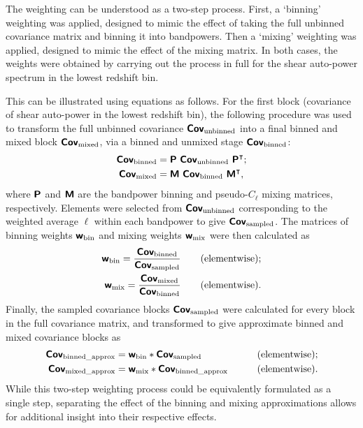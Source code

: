 The weighting can be understood as a two-step process.
First, a `binning' weighting was applied, designed to mimic the effect of taking the full unbinned covariance matrix and binning it into bandpowers. Then a `mixing' weighting was applied, designed to mimic the effect of the mixing matrix. In both cases, the weights were obtained by carrying out the process in full for the shear auto-power spectrum in the lowest redshift bin.

This can be illustrated using equations as follows. For the first block (covariance of shear auto-power in the lowest redshift bin), the following procedure was used to transform the full unbinned covariance $\bm{\mathsf{Cov}}_\text{unbinned}$ into a final binned and mixed block $\bm{\mathsf{Cov}}_\text{mixed}$, via a binned and unmixed stage $\bm{\mathsf{Cov}}_\text{binned}$:
\begin{align}
\bm{\mathsf{Cov}}_\text{binned} &=
\bm{\mathsf{P}} ~ \bm{\mathsf{Cov}}_\text{unbinned} ~
\bm{\mathsf{P}}^\intercal; \\
\bm{\mathsf{Cov}}_\text{mixed} &=
\bm{\mathsf{M}} ~ \bm{\mathsf{Cov}}_\text{binned} ~
\bm{\mathsf{M}}^\intercal,
\end{align}
where $\bm{\mathsf{P}}$ and $\bm{\mathsf{M}}$ are the bandpower binning and pseudo-$C_\ell$ mixing matrices, respectively. Elements were selected from $\bm{\mathsf{Cov}}_\text{unbinned}$ corresponding to the weighted average $\ell$ within each bandpower to give $\bm{\mathsf{Cov}}_\text{sampled}$. The matrices of binning weights $\bm{\mathsf{w}}_\text{bin}$ and mixing weights $\bm{\mathsf{w}}_\text{mix}$ were then calculated as
\begin{align}
\bm{\mathsf{w}}_\text{bin} =
\frac{\bm{\mathsf{Cov}}_\text{binned}}
{\bm{\mathsf{Cov}}_\text{sampled}}
\qquad&\text{(elementwise);} \\
\bm{\mathsf{w}}_\text{mix} =
\frac{\bm{\mathsf{Cov}}_\text{mixed}}
{\bm{\mathsf{Cov}}_\text{binned}}
\qquad&\text{(elementwise).}
\end{align}
Finally, the sampled covariance blocks $\bm{\mathsf{Cov}}_\text{sampled}$ were calculated for every block in the full covariance matrix, and transformed to give approximate binned and mixed covariance blocks as
\begin{alignat}{2}
\bm{\mathsf{Cov}}_\text{binned\_approx} &=
\bm{\mathsf{w}}_\text{bin} *
\bm{\mathsf{Cov}}_\text{sampled}
\qquad&&
\text{(elementwise);} \\
\bm{\mathsf{Cov}}_\text{mixed\_approx} &=
\bm{\mathsf{w}}_\text{mix} *
\bm{\mathsf{Cov}}_\text{binned\_approx}
\qquad&&
\text{(elementwise).}
\end{alignat}
While this two-step weighting process could be equivalently formulated as a single step, separating the effect of the binning and mixing approximations allows for additional insight into their respective effects.

